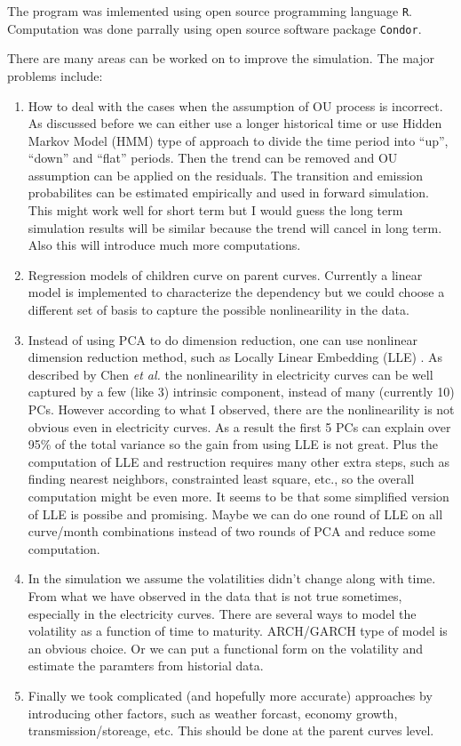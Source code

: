 \documentclass[12pt]{article}
\begin{document}
The program was imlemented using open source programming
language {\tt R}. Computation was done parrally using
open source software package {\tt Condor}. 

There are many areas can be worked on to improve the simulation.
The major problems include:
\begin{enumerate}
\item How to deal with the cases when the 
assumption of OU process is incorrect.
As discussed before we can either use a longer 
historical time or use Hidden Markov Model (HMM) type
of approach to divide the time period into ``up'', ``down''
and ``flat'' periods. Then the trend can be removed and 
OU assumption can be applied on the residuals.
The transition and emission probabilites
can be estimated empirically and used in forward simulation. 
This might work well for short term but I would guess the long term
simulation results will be similar because the trend will cancel
in long term. Also this will introduce much more computations. 
\item Regression models of children curve on parent curves. 
Currently a linear model is implemented to characterize the dependency
but we could choose a different set of basis to capture
the possible nonlinearility in the data. 
\item Instead of using PCA to do dimension reduction, 
one can use nonlinear dimension reduction method,
such as Locally Linear Embedding (LLE) . 
As described by Chen {\it et al.} the nonlinearility
in electricity curves can be well captured by a few (like 3)
intrinsic component, instead of many (currently 10) PCs. 
However according to what I observed, there are
the nonlinearility is not obvious even in electricity curves.
As a result the first 5 PCs can explain over 95\% of
the total variance so the gain from using LLE is not great.
Plus the computation of LLE and 
restruction requires many other extra steps, such as finding nearest 
neighbors, constrainted least square, etc., so the overall
computation might be even more. It seems to be that some simplified version
of  LLE is possibe and promising. Maybe we 
can do one round of LLE on all curve/month combinations 
instead of two rounds of PCA and reduce some computation.
\item In the simulation we assume the volatilities didn't
change along with time. From what we have observed in
the data that is not true sometimes, especially in the 
electricity curves. There are several ways to model the volatility
as a function of time to maturity. ARCH/GARCH type of model
is an obvious choice. Or we can put a functional form 
on the volatility and estimate the paramters from historial data.
\item Finally we took complicated (and hopefully more 
accurate) approaches by introducing other factors, such as
weather forcast, economy growth, transmission/storeage, etc.
This should be done at the parent curves level. 
\end{enumerate}
\end{document}
